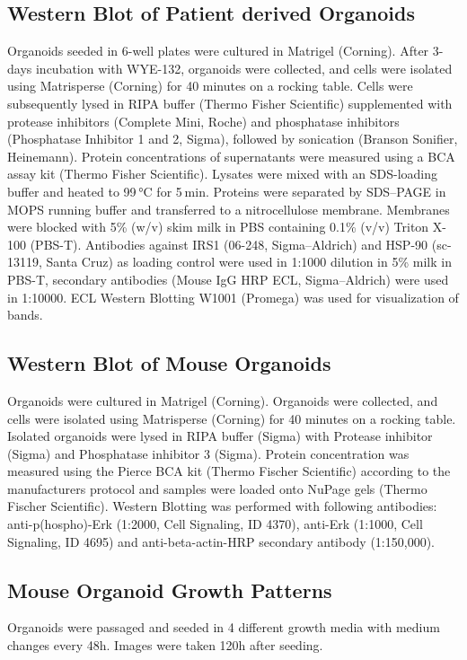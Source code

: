 \begin{flushleft}
\subsection{Western Blot of Patient derived Organoids}
Organoids seeded in 6-well plates were cultured in Matrigel (Corning). After 3-days incubation with WYE-132, organoids were collected, and cells were isolated using Matrisperse (Corning) for 40 minutes on a rocking table. Cells were subsequently lysed in RIPA buffer (Thermo Fisher Scientific) supplemented with protease inhibitors (Complete Mini, Roche) and phosphatase inhibitors (Phosphatase Inhibitor 1 and 2, Sigma), followed by sonication (Branson Sonifier, Heinemann). Protein concentrations of supernatants were measured using a BCA assay kit (Thermo Fisher Scientific). Lysates were mixed with an SDS-loading buffer and heated to 99 °C for 5 min. Proteins were separated by SDS–PAGE in MOPS running buffer and transferred to a nitrocellulose membrane. Membranes were blocked with 5\% (w/v) skim milk in PBS containing 0.1\% (v/v) Triton X-100 (PBS-T). Antibodies against IRS1 (06-248, Sigma–Aldrich) and HSP-90 (sc-13119, Santa Cruz) as loading control were used in 1:1000 dilution in 5\% milk in PBS-T, secondary antibodies (Mouse IgG HRP ECL, Sigma–Aldrich) were used in 1:10000. ECL Western Blotting W1001 (Promega) was used for visualization of bands.

\subsection{Western Blot of Mouse Organoids}
Organoids were cultured in Matrigel (Corning). Organoids were collected, and cells were isolated using Matrisperse (Corning) for 40 minutes on a rocking table. Isolated organoids were lysed in RIPA buffer (Sigma) with Protease inhibitor (Sigma) and Phosphatase inhibitor 3 (Sigma). Protein concentration was measured using the Pierce BCA kit (Thermo Fischer Scientific) according to the manufacturers protocol and samples were loaded onto NuPage gels (Thermo Fischer Scientific). Western Blotting was performed with following antibodies: anti-p(hospho)-Erk (1:2000, Cell Signaling, ID 4370), anti-Erk (1:1000, Cell Signaling, ID 4695) and anti-beta-actin-HRP secondary antibody (1:150,000).

\subsection{Mouse Organoid Growth Patterns}
Organoids were passaged and seeded in 4 different growth media with medium changes every 48h. Images were taken 120h after seeding.  


\end{flushleft}
